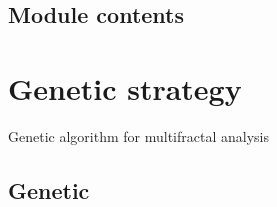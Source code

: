 \documentclass[letterpaper,10pt,english]{sphinxmanual}
\begin{document}
\begin{fulllineitems}
\label{\detokenize{CBBAlgorithm:CBBAlgorithm.CBBAlgorithm.CBBFractality}}
\end{fulllineitems}


\begin{fulllineitems}
\label{\detokenize{CBBAlgorithm:CBBAlgorithm.CBBAlgorithm.calculateLb}}
\end{fulllineitems}



\subsection{Module contents}
\label{\detokenize{CBBAlgorithm:module-CBBAlgorithm}}\label{\detokenize{CBBAlgorithm:module-contents}}

\section{Genetic strategy}
\label{\detokenize{Genetic:genetic-strategy}}\label{\detokenize{Genetic::doc}}
Genetic algorithm for multifractal analysis


\subsection{Genetic}
\label{\detokenize{Genetic:module-Genetic.Genetic}}\label{\detokenize{Genetic:genetic}}
\end{document}
